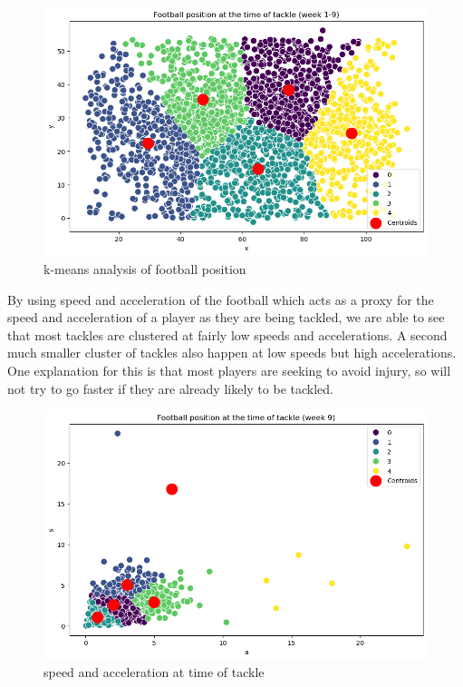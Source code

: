 \documentclass[bibtex, sigconf, hyperref={colorlinks=true,linkcolor=blue,urlcolor=blue}]{acmart}
\begin{document}
\begin{figure}[h]
  \centering
  \includegraphics[width=\linewidth]{k-means}
  \caption{k-means analysis of football position}
\end{figure}

By using speed and acceleration of the football which acts as a proxy for the
speed and acceleration of a player as they are being tackled, we are able to see
that most tackles are clustered at fairly low speeds and accelerations. A second
much smaller cluster of tackles also happen at low speeds but high accelerations.
One explanation for this is that most players are seeking to avoid injury, so
will not try to go faster if they are already likely to be tackled.

\begin{figure}[h]
  \centering
  \includegraphics[width=\linewidth]{speed-accel}
  \caption{speed and acceleration at time of tackle}
\end{figure}
\end{document}

